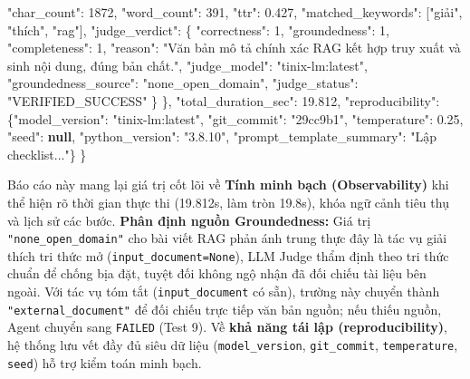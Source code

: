 \documentclass[]{article}
\newenvironment{Shaded}{}{}
\newcommand{\DataTypeTok}[1]{\textcolor[rgb]{0.56,0.13,0.00}{#1}}
\newcommand{\DecValTok}[1]{\textcolor[rgb]{0.25,0.63,0.44}{#1}}
\newcommand{\FloatTok}[1]{\textcolor[rgb]{0.25,0.63,0.44}{#1}}
\newcommand{\KeywordTok}[1]{\textcolor[rgb]{0.00,0.44,0.13}{\textbf{#1}}}
\newcommand{\NormalTok}[1]{#1}
\newcommand{\StringTok}[1]{\textcolor[rgb]{0.25,0.44,0.63}{#1}}
\begin{document}
\begin{footnotesize}
\begin{Shaded}
\begin{Highlighting}[]
\NormalTok{    }\DataTypeTok{"char\_count"}\NormalTok{: }\DecValTok{1872}\NormalTok{, }\DataTypeTok{"word\_count"}\NormalTok{: }\DecValTok{391}\NormalTok{, }\DataTypeTok{"ttr"}\NormalTok{: }\FloatTok{0.427}\NormalTok{, }\DataTypeTok{"matched\_keywords"}\NormalTok{: [}\StringTok{"giải"}\NormalTok{, }\StringTok{"thích"}\NormalTok{, }\StringTok{"rag"}\NormalTok{],}
\NormalTok{    }\DataTypeTok{"judge\_verdict"}\NormalTok{: \{}
\NormalTok{      }\DataTypeTok{"correctness"}\NormalTok{: }\DecValTok{1}\NormalTok{, }\DataTypeTok{"groundedness"}\NormalTok{: }\DecValTok{1}\NormalTok{, }\DataTypeTok{"completeness"}\NormalTok{: }\DecValTok{1}\NormalTok{,}
\NormalTok{      }\DataTypeTok{"reason"}\NormalTok{: }\StringTok{"Văn bản mô tả chính xác RAG kết hợp truy xuất và sinh nội dung, đúng bản chất."}\NormalTok{,}
\NormalTok{      }\DataTypeTok{"judge\_model"}\NormalTok{: }\StringTok{"tinix-lm:latest"}\NormalTok{, }\DataTypeTok{"groundedness\_source"}\NormalTok{: }\StringTok{"none\_open\_domain"}\NormalTok{, }\DataTypeTok{"judge\_status"}\NormalTok{: }\StringTok{"VERIFIED\_SUCCESS"}
\NormalTok{    \}}
\NormalTok{  \},}
\NormalTok{  }\DataTypeTok{"total\_duration\_sec"}\NormalTok{: }\FloatTok{19.812}\NormalTok{,}
\NormalTok{  }\DataTypeTok{"reproducibility"}\NormalTok{: \{}\DataTypeTok{"model\_version"}\NormalTok{: }\StringTok{"tinix-lm:latest"}\NormalTok{, }\DataTypeTok{"git\_commit"}\NormalTok{: }\StringTok{"29cc9b1"}\NormalTok{, }\DataTypeTok{"temperature"}\NormalTok{: }\FloatTok{0.25}\NormalTok{, }\DataTypeTok{"seed"}\NormalTok{: }\KeywordTok{null}\NormalTok{, }\DataTypeTok{"python\_version"}\NormalTok{: }\StringTok{"3.8.10"}\NormalTok{, }\DataTypeTok{"prompt\_template\_summary"}\NormalTok{: }\StringTok{"Lập checklist..."}\NormalTok{\}}
\NormalTok{\}}
\end{Highlighting}
\end{Shaded}
\end{footnotesize}

Báo cáo này mang lại giá trị cốt lõi về \textbf{Tính minh bạch (Observability)} khi thể hiện rõ thời gian thực thi (19.812s, làm tròn 19.8s), khóa ngữ cảnh tiêu thụ và lịch sử các bước. \textbf{Phân định nguồn Groundedness:} Giá trị \texttt{"none\_open\_domain"} cho bài viết RAG phản ánh trung thực đây là tác vụ giải thích tri thức mở (\texttt{input\_document=None}), LLM Judge thẩm định theo tri thức chuẩn để chống bịa đặt, tuyệt đối không ngộ nhận đã đối chiếu tài liệu bên ngoài. Với tác vụ tóm tắt (\texttt{input\_document} có sẵn), trường này chuyển thành \texttt{"external\_document"} để đối chiếu trực tiếp văn bản nguồn; nếu thiếu nguồn, Agent chuyển sang \texttt{FAILED} (Test 9). Về \textbf{khả năng tái lập (reproducibility)}, hệ thống lưu vết đầy đủ siêu dữ liệu (\texttt{model\_version}, \texttt{git\_commit}, \texttt{temperature}, \texttt{seed}) hỗ trợ kiểm toán minh bạch.
\end{document}
